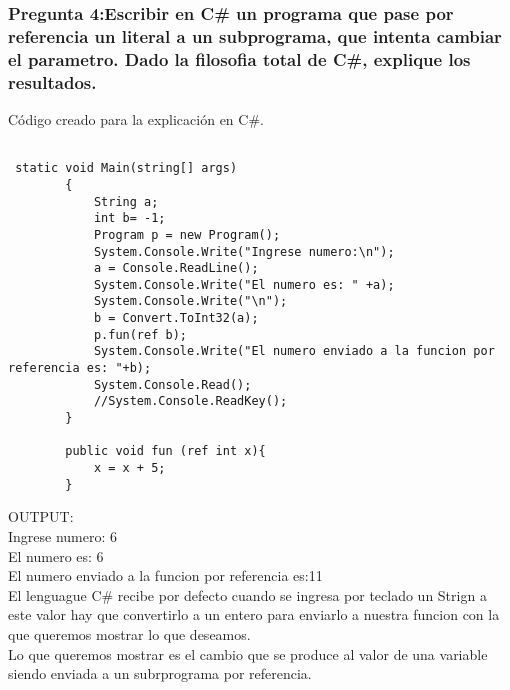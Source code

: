 \subsubsection{Pregunta 4:Escribir en C\# un programa que pase por referencia un literal a un subprograma, que intenta cambiar el parametro. Dado la filosofia total de C\#, explique los resultados.}
\lstset{language = C}  %
Código creado para la explicación en C\#.
\begin{lstlisting}[frame = single] %Comienzo del Código

 static void Main(string[] args)
        {
            String a;
            int b= -1;
            Program p = new Program();
            System.Console.Write("Ingrese numero:\n");
            a = Console.ReadLine();
            System.Console.Write("El numero es: " +a);
            System.Console.Write("\n");
            b = Convert.ToInt32(a);
            p.fun(ref b);
            System.Console.Write("El numero enviado a la funcion por referencia es: "+b);
            System.Console.Read();
            //System.Console.ReadKey();
        }

        public void fun (ref int x){
            x = x + 5;  
        }
\end{lstlisting}
OUTPUT:\\
	Ingrese numero: 6\\
	El numero es: 6\\
	El numero enviado a la funcion por referencia es:11\\
	El lenguague C\# recibe por defecto cuando se ingresa por teclado un Strign a este valor hay que convertirlo a un entero para enviarlo a nuestra funcion con la que queremos mostrar lo que deseamos.\\
 Lo que queremos mostrar es el cambio que se produce al valor de una variable siendo enviada a un subrprograma por referencia.\\

